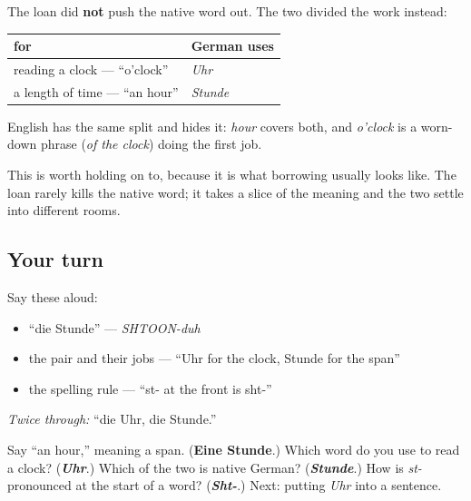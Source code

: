 \begin{culture}
The loan did \textbf{not} push the native word out. The two divided the work instead:

\noindent
\begin{tabularx}{\linewidth}{@{}>{\raggedright\arraybackslash}X>{\raggedright\arraybackslash}X@{}}
\toprule
\textbf{for} & \textbf{German uses} \\
\midrule
reading a clock — \textquotedblleft{}o'clock\textquotedblright{} & \emph{Uhr} \\
a length of time — \textquotedblleft{}an hour\textquotedblright{} & \emph{Stunde} \\
\bottomrule
\end{tabularx}

English has the same split and hides it: \emph{hour} covers both, and \emph{o'clock} is a worn-down phrase (\emph{of the clock}) doing the first job.

This is worth holding on to, because it is what borrowing usually looks like. The loan rarely kills the native word; it takes a slice of the meaning and the two settle into different rooms.
\end{culture}

\subsection*{Your turn}
Say these aloud:

\begin{itemize}
\raggedright
  \item \textquotedblleft{}die Stunde\textquotedblright{} — \emph{SHTOON-duh}
  \item the pair and their jobs — \textquotedblleft{}Uhr for the clock, Stunde for the span\textquotedblright{}
  \item the spelling rule — \textquotedblleft{}st- at the front is sht-\textquotedblright{}
\end{itemize}

\emph{Twice through:} \textquotedblleft{}die Uhr, die Stunde.\textquotedblright{}

\begin{tcolorbox}[breakable,colback=teal!4,colframe=teal!35!black,title={Before you move on}]
Say \textquotedblleft{}an hour,\textquotedblright{} meaning a span. (\textbf{Eine Stunde}.) Which word do you use to read a clock? (\emph{\textbf{Uhr}}.) Which of the two is native German? (\emph{\textbf{Stunde}}.) How is \emph{st-} pronounced at the start of a word? (\emph{\textbf{Sht-}}.) Next: putting \emph{Uhr} into a sentence.
\end{tcolorbox}
